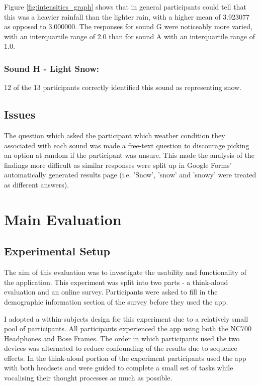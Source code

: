 \documentclass{l4proj}
\begin{document}
Figure \ref{fig:intensities_graph} shows that in general participants could tell that this was a heavier rainfall than the lighter rain, with a higher mean of \num{3.923077} as opposed to \num{3.000000}.
The responses for sound G were noticeably more varied, with an interquartile range of \num{2.0} than for sound A with an interquartile range of \num{1.0}.

\subsubsection{Sound H - Light Snow: }

12 of the 13 participants correctly identified this sound as representing snow.

\subsection{Issues}
The question which asked the participant which weather condition they associated with each sound was made a free-text question to discourage picking an option at random if the participant was unsure. This made the analysis of the findings more difficult as similar responses were split up in Google Forms' automatically generated results page (i.e. 'Snow', 'snow' and 'snowy' were treated as different answers).

\section{Main Evaluation} \label{sec:main_eval}

\subsection{Experimental Setup}
The aim of this evaluation was to investigate the usability and functionality of the application.
This experiment was split into two parts - a think-aloud evaluation and an online survey. Participants were asked to fill in the demographic information section of the survey before they used the app.

I adopted a within-subjects design for this experiment due to a relatively small pool of participants. All participants experienced the app using both the NC700 Headphones and Bose Frames. The order in which participants used the two devices was alternated to reduce confounding of the results due to sequence effects.
In the think-aloud portion of the experiment participants used the app with both headsets and were guided to complete a small set of tasks while vocalising their thought processes as much as possible.
\end{document}
